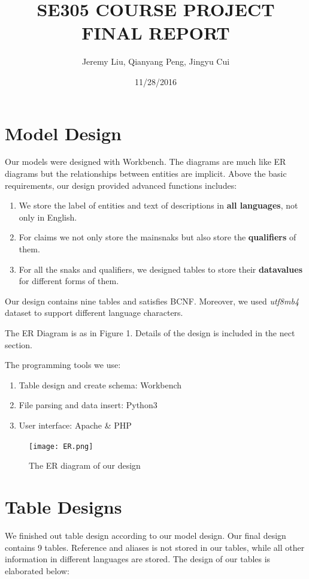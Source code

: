 \documentclass[12pt]{article}
\title{SE305 COURSE PROJECT FINAL REPORT}
\author{Jeremy Liu, Qianyang Peng, Jingyu Cui}
\date{11/28/2016}
\begin{document}
\maketitle
\tableofcontents
\newpage
{}


\section{Model Design}

Our models were designed with Workbench. The diagrams are much like ER diagrams but the relationships between entities are implicit. Above the basic requirements, our design provided advanced functions includes:
\begin{enumerate}
	\item We store the label of entities and text of descriptions in \textbf{all languages}, not only in English.
	\item For claims we not only store the mainsnaks but also store the \textbf{qualifiers} of them.
	\item For all the snaks and qualifiers, we designed tables to store their \textbf{datavalues} for different forms of them.
\end{enumerate}

Our design contains nine tables and satisfies BCNF. Moreover, we used \emph{utf8mb4} dataset to support different language characters.

The ER Diagram is as in Figure 1. Details of the design is included in the nect section.

The programming tools we use:
\begin{enumerate}
	\item Table design and create schema: Workbench
	\item File parsing and data insert: Python3
	\item User interface: Apache \& PHP
\end{enumerate}
\begin{figure}
\label{ER DIAGRAM}
\centering
\texttt{[image: ER.png]}
\caption{The ER diagram of our design}
\end{figure}
\section{Table Designs}
We finished out table design according to our model design. Our final design contains 9 tables. Reference and aliases is not stored in our tables, while all other information in different languages are stored. The design of our tables is elaborated below:
\end{document}
